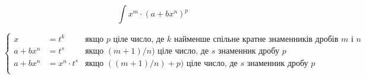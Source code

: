 \begin{center}\normalsize{}\end{center}
  
  $$\boxed{ \int x^m \cdot (a+bx^n)^p }$$
  
 
$$\left \{
\begin{array}{lll} 
  x & = t^k & {\text{якщо $p$ ціле число, де $k$ найменше
спільне кратне знаменників дробів $m$ і $n$}} \\
  a+bx^n & = t^s & {\text{якщо $(m+1)/n)$ ціле число, де $s$ знаменник дробу $p$}} \\
  a+bx^n & = x^n \cdot t^s & {\text{якщо $((m+1)/n)+p)$ ціле число, де $s$ знаменник дробу $p$}} \\
  \end{array}
$$